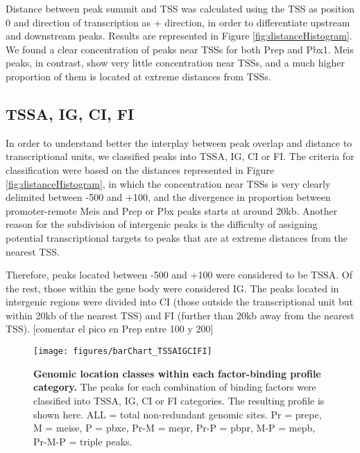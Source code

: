 Distance between peak summit and \ac{TSS} was calculated using the \ac{TSS} as position 0 and direction of transcription as + direction, in order to differentiate upstream and downstream peaks. Results are represented in Figure \ref{fig:distanceHistogram}. We found a clear concentration of peaks near \ac{TSS}s for both Prep and Pbx1. Meis peaks, in contrast, show very little concentration near \ac{TSS}s, and a much higher proportion of them is located at extreme distances from \ac{TSS}s. 


\subsection{TSSA, IG, CI, FI}

In order to understand better the interplay between peak overlap and distance to transcriptional units, we classified peaks into \ac{TSSA}, \ac{IG}, \ac{CI} or \ac{FI}. The criteria for classification were based on the  distances represented in Figure \ref{fig:distanceHistogram}, in which the concentration near \acp{TSS} is very clearly delimited between -500 and +100, and the divergence in proportion between promoter-remote Meis and Prep or Pbx peaks starts at around 20kb. Another reason for the subdivision of intergenic peaks is the difficulty of assigning potential transcriptional targets to peaks that are at extreme distances from the nearest \ac{TSS}.

Therefore, peaks located between -500 and +100 were considered to be \ac{TSSA}. Of the rest, those within the gene body were considered \ac{IG}. The peaks located in intergenic regions were divided into \ac{CI} (those outside the transcriptional unit but within 20kb of the nearest \ac{TSS}) and \ac{FI} (further than 20kb away from the nearest \ac{TSS}). 
[comentar el pico en Prep entre 100 y 200]

\begin{figure}[]
  
  \centering
  \texttt{[image: figures/barChart\_TSSAIGCIFI]}
  \caption[Genomic location classes within each factor-binding profile category]{\textbf{Genomic location classes within each factor-binding profile category.} The peaks for each combination of binding factors were classified into \ac{TSSA}, \ac{IG}, \ac{CI} or \ac{FI} categories. The resulting profile is shown here. ALL = total non-redundant genomic sites. Pr = \ac{prepe}, M = \ac{meise}, P = \ac{pbxe}, Pr-M = \ac{mepr}, Pr-P = \ac{pbpr}, M-P = \ac{mepb}, Pr-M-P = triple peaks.}
  \label{fig:distanceBarChart}
\end{figure}

